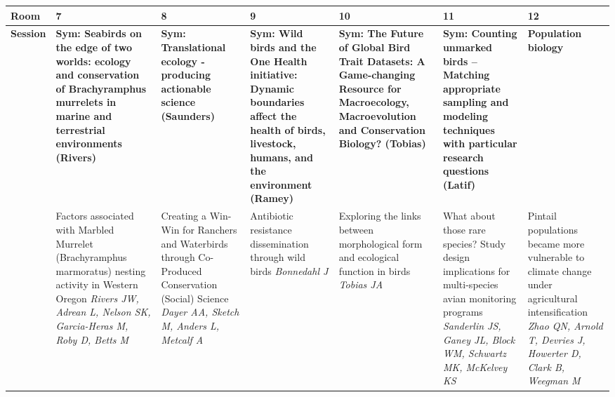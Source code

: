 \begin{tabular}{|x{0.75cm}|a{2.25cm}|a{2.25cm}|a{2.25cm}|a{2.25cm}|a{2.25cm}|x{2.25cm}|}\hline
Room & 7 & 8 & 9 & 10 & 11 & 12\\
\hline
\rule{0pt}{1em} \textbf{Session} &\footnotesize \textbf{Sym: Seabirds on the edge of two worlds: ecology and conservation of Brachyramphus murrelets in marine and terrestrial environments (Rivers)} & \footnotesize \textbf{Sym: Translational ecology - producing actionable science (Saunders)} & \footnotesize \textbf{Sym: Wild birds and the One Health initiative: Dynamic boundaries affect the health of birds, livestock, humans, and the environment (Ramey)} & \footnotesize \textbf{Sym: The Future of Global Bird Trait Datasets: A Game-changing Resource for Macroecology, Macroevolution and Conservation Biology? (Tobias)} & \footnotesize \textbf{Sym: Counting unmarked birds – Matching appropriate sampling and modeling techniques with particular research questions (Latif)} & \footnotesize \textbf{Population biology}\\
\hline
{}&Factors associated with Marbled Murrelet (Brachyramphus marmoratus) nesting activity in Western Oregon \newline \newline \textit{Rivers JW, Adrean L, Nelson SK, Garcia-Heras M, Roby D, Betts M} & Creating a Win-Win for Ranchers and Waterbirds through Co-Produced Conservation (Social) Science \newline \newline \textit{Dayer AA, Sketch M, Anders L, Metcalf A} & Antibiotic resistance dissemination through wild birds \newline \newline \textit{Bonnedahl J} & Exploring the links between morphological form and ecological function in birds \newline \newline \textit{Tobias JA} & What about those rare species? Study design implications for multi-species avian monitoring programs \newline \newline \textit{Sanderlin JS, Ganey JL, Block WM, Schwartz MK, McKelvey KS} & Pintail populations became more vulnerable to climate change under agricultural intensification \newline \newline \textit{Zhao QN, Arnold T, Devries J, Howerter D, Clark B, Weegman M}\\
\hline

\end{tabular}
